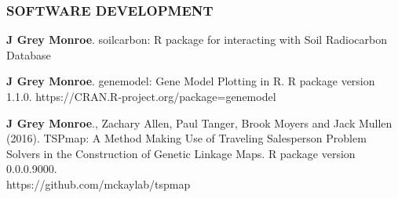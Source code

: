 \documentclass[12pt,english]{article}
\begin{document}
\vspace{0.5em}\par



\subsubsection*{SOFTWARE DEVELOPMENT}
\vspace{-0.5ex}

\begin{hangparas}{.5in}{1}
\hspace{1em}\textbf{J Grey Monroe}. soilcarbon: R package for interacting with Soil Radiocarbon Database\vspace{0.5ex}\par
\hspace{1em}\textbf{J Grey Monroe}. genemodel: Gene Model Plotting in R. R package version 1.1.0.
  https://CRAN.R-project.org/package=genemodel
\vspace{0.5ex}\par
\hspace{1em}\textbf{J Grey Monroe}., Zachary Allen, Paul Tanger, Brook Moyers and Jack Mullen (2016). TSPmap: A Method Making Use of Traveling Salesperson Problem Solvers in the Construction of Genetic Linkage Maps. R package version 0.0.0.9000. \\https://github.com/mckaylab/tspmap

\end{hangparas}
\end{document}
